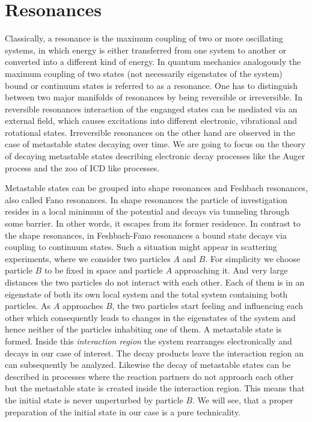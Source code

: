 \chapter{Resonances}

Classically, a resonance is the maximum coupling of two or more
oscillating systems, in which energy is either transferred from 
one system to another or converted into a different kind of energy.
In quantum mechanics analogously the maximum coupling 
of two states (not necessarily eigenstates of the system) 
bound or continuum states is referred to as a resonance.
One has to distinguish between two major manifolds of resonances
by being reversible or irreversible.
In reversible resonances
interaction of the enganged states can be mediated via an external field,
which causes excitations
into different electronic, vibrational and rotational states.
Irreversible resonances on the other hand are observed in the case of
metastable states decaying over time. We are going to focus on the theory of
decaying metastable states describing electronic decay processes like the
Auger process and the zoo of \ac{ICD} like processes. 

Metastable states can be grouped into shape resonances and Feshbach resonances,
also called Fano resonances. In shape resonances the particle of investigation
resides in
a local minimum of the potential and decays via tunneling through some barrier.
In other words, it escapes from its former residence.
In contrast to the shape resonances, in Feshbach-Fano resonances
a bound state decays via coupling to continuum states. Such a situation might
appear in scattering experiments, where we consider two particles $A$ and $B$.
For simplicity we choose particle $B$ to be fixed in space and particle $A$
approaching it. And very large distances the two particles do not interact with
each other. Each of them is in an eigenstate of both its own local system
and the total system containing both particles. As $A$ approaches $B$, the two
particles start feeling and influencing each other which consequently leads
to changes in the eigenstates of the system and hence neither of the particles
inhabiting one of them. A metastable state is formed. Inside this
\emph{interaction region} the system
rearranges electronically and decays in our case of interest. The decay
products leave the interaction region an can subsequently be analyzed.
Likewise the decay of metastable states can be described in processes
where the reaction partners do not approach each other but the metastable
state is created inside the interaction region. This means that the initial
state is never unperturbed by particle $B$. We will see, that a proper
preparation of the initial state in our case is a pure technicality.

